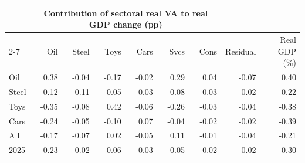 \begin{tabular}{lrrrrrrrr}
\toprule
 & \multicolumn{6}{c}{Contribution of sectoral real VA to real GDP change (pp)} & & \\
\cmidrule(lr){2-7}
 & Oil & Steel & Toys & Cars & Svcs & Cons & Residual & Real GDP (\%) \\
\midrule
Oil & 0.38 & -0.04 & -0.17 & -0.02 & 0.29 & 0.04 & -0.07 & 0.40 \\
Steel & -0.12 & 0.11 & -0.05 & -0.03 & -0.08 & -0.03 & -0.02 & -0.22 \\
Toys & -0.35 & -0.08 & 0.42 & -0.06 & -0.26 & -0.03 & -0.04 & -0.38 \\
Cars & -0.24 & -0.05 & -0.10 & 0.07 & -0.04 & -0.02 & -0.02 & -0.39 \\
All & -0.17 & -0.07 & 0.02 & -0.05 & 0.11 & -0.01 & -0.04 & -0.21 \\
2025 & -0.23 & -0.02 & 0.06 & -0.03 & -0.05 & -0.02 & -0.02 & -0.30 \\
\bottomrule
\end{tabular}
